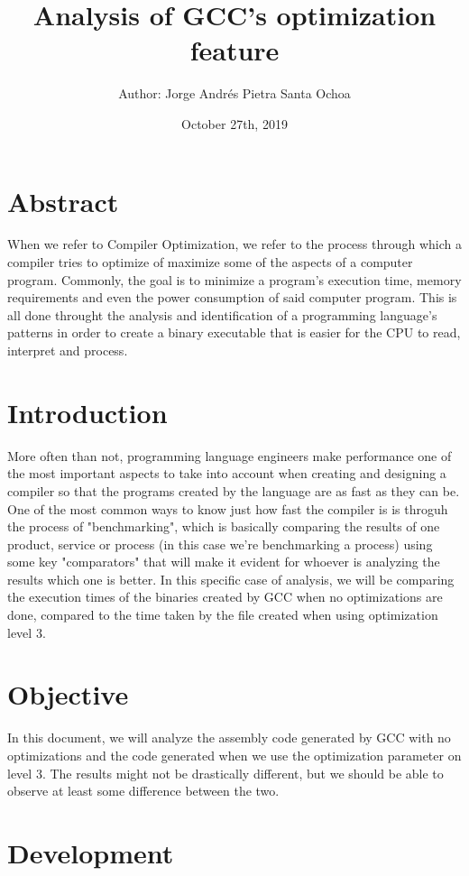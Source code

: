 \documentclass[a4paper]{article}
\title{Analysis of GCC's optimization feature}
\author{\normalsize Author: Jorge Andrés Pietra Santa Ochoa \\\normalsize}
\date{\color{black}October 27th, 2019}
\begin{document}
 \maketitle

\section{Abstract}

When we refer to Compiler Optimization, we refer to the process through which a compiler 
tries to optimize of maximize some of the aspects of a computer program. Commonly, the goal is 
to minimize a program's execution time, memory requirements and even the power consumption of said 
computer program. This is all done throught the analysis and identification of a programming language's 
patterns in order to create a binary executable that is easier for the CPU to read, interpret and process.
 

\section{Introduction}

More often than not, programming language engineers make performance one of the most important 
aspects to take into account when creating and designing a compiler so that the programs created by 
the language are as fast as they can be. One of the most common ways to know just how fast the compiler 
is is throguh the process of "benchmarking", which is basically comparing the results of one product, 
service or process (in this case we're benchmarking a process) using some key "comparators" that will 
make it evident for whoever is analyzing the results which one is better. In this specific case of analysis, 
we will be comparing the execution times of the binaries created by GCC when no optimizations are done, 
compared to the time taken by the file created when using optimization level 3.


\section{Objective}

In this document, we will analyze the assembly code generated by GCC with no optimizations and the code 
generated when we use the optimization parameter on level 3. The results might not be drastically different, 
but we should be able to observe at least some difference between the two.

\section{Development}
\end{document}
